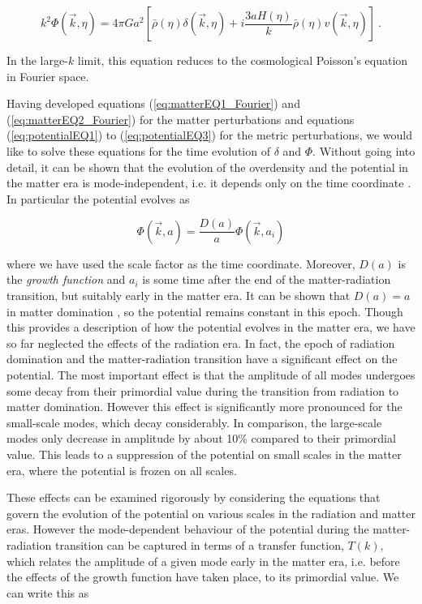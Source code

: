 \documentclass[10pt,letterpaper,final]{iopart}
\numberwithin{equation}{subsection}
\def\ni{\noindent}
\begin{document}
\begin{equation}\label{eq:potentialEQ3}
k^2\Phi(\vec{k}, \eta) = 4\pi G a^2 \left[\bar{\rho}(\eta)\delta(\vec{k}, \eta) + i\frac{3aH(\eta)}{k}\bar{\rho}(\eta) v(\vec{k}, \eta)\right] \ .
\end{equation}

\ni In the large-$k$ limit, this equation reduces to the cosmological Poisson's equation in Fourier space. 

Having developed equations (\ref{eq:matterEQ1_Fourier}) and (\ref{eq:matterEQ2_Fourier}) for the matter perturbations and equations (\ref{eq:potentialEQ1}) to (\ref{eq:potentialEQ3}) for the metric perturbations, we would like to solve these equations for the time evolution of $\delta$ and $\Phi$. Without going into detail, it can be shown that the evolution of the overdensity and the potential in the matter era is mode-independent, i.e. it depends only on the time coordinate \cite{Schneider}\cite{Dodelson}\cite{Baumann}. In particular the potential evolves as 

\begin{equation}\label{eq:potentialgrowth}
\Phi(\vec{k},a) = \frac{D(a)}{a}\Phi(\vec{k},a_i)
\end{equation}

\ni where we have used the scale factor as the time coordinate. Moreover, $D(a)$ is the \emph{growth function} and $a_i$ is some time after the end of the matter-radiation transition, but suitably early in the matter era. It can be shown that $D(a) = a$ in matter domination \cite{Schneider}\cite{Dodelson}\cite{Baumann}, so the potential remains constant in this epoch. Though this provides a description of how the potential evolves in the matter era, we have so far neglected the effects of the radiation era. In fact, the epoch of radiation domination and the matter-radiation transition have a significant effect on the potential. The most important effect is that the amplitude of all modes undergoes some decay from their primordial value during the transition from radiation to matter domination. However this effect is significantly more pronounced for the small-scale modes, which decay considerably. In comparison, the large-scale modes only decrease in amplitude by about 10\% compared to their primordial value. This leads to a suppression of the potential on small scales in the matter era, where the potential is frozen on all scales.

These effects can be examined rigorously  by considering the equations that govern the evolution of the potential on various scales in the radiation and matter eras. However the mode-dependent behaviour of the potential during the matter-radiation transition can be captured in terms of a transfer function, $T(k)$, which relates the amplitude of a given mode early in the matter era, i.e. before the effects of the growth function have taken place, to its primordial value. We can write this as
\end{document}
